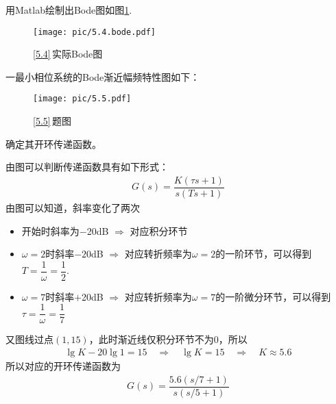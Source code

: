用Matlab绘制出Bode图如图\ref{F5.4.2}.
\begin{figure}[!htb]
	\centering
	\texttt{[image: pic/5.4.bode.pdf]}
	\caption{\ref{5.4}$\,$实际Bode图}
	\label{F5.4.2}
\end{figure}
\newpage

\vspace*{-2em}
\examples \label{5.5}一最小相位系统的Bode渐近幅频特性图如下：
\begin{figure}[!htb]
	\centering
	\texttt{[image: pic/5.5.pdf]}
	\caption{\ref{5.5}$\,$题图}
	\label{F5.5}
\end{figure}

确定其开环传递函数。

\solve 由图可以判断传递函数具有如下形式：
\begin{align*}
	G(s) = \dfrac{K(\tau s + 1)}{s(Ts + 1)}
\end{align*}
由图可以知道，斜率变化了两次
\begin{itemize}
	\item 开始时斜率为$-$20dB \quad $\Rightarrow$ \quad 对应积分环节
	\item $\omega = 2$时斜率$-20$dB \quad $\Rightarrow$ \quad 对应转折频率为$\omega = 2$的一阶环节，可以得到$T = \dfrac{1}{\omega} = \dfrac{1}{2}$.
	\item $\omega = 7$时斜率$+$20dB \quad $\Rightarrow$ \quad 对应转折频率为$\omega = 7$的一阶微分环节，可以得到$\tau = \dfrac{1}{\omega} = \dfrac{1}{7}$
\end{itemize}
又图线过点$(1, 15)$，此时渐近线仅积分环节不为0，所以
\begin{align*}
	\lg K - 20\lg 1 = 15 \quad \Rightarrow \quad \lg K = 15 \quad \Rightarrow \quad K \approx 5.6
\end{align*}
所以对应的开环传递函数为
\begin{align*}
	G(s) = \dfrac{5.6(s/7 + 1)}{s(s/5 + 1)}
\end{align*}
\vspace*{-2em}


